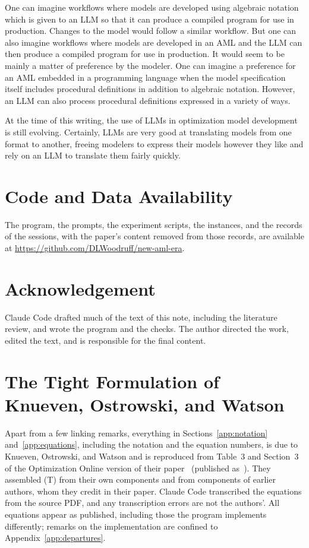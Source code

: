 \documentclass[11pt]{article}
\begin{document}
One can imagine workflows where models are developed using algebraic
notation which is given to an LLM so that it can produce a compiled
program for use in production. Changes to the model would follow a
similar workflow. But one can also imagine workflows where models are
developed in an AML and the LLM can then produce a compiled program
for use in production. It would seem to be mainly a matter of
preference by the modeler.  One can imagine a preference
for an AML embedded in a programming language when the model
specification itself includes procedural definitions in addition to
algebraic notation. However, an LLM can also process procedural definitions
expressed in a variety of ways.

At the time of this writing, the use of LLMs in optimization model
development is still evolving. Certainly, LLMs are very good at
translating models from one format to another, freeing modelers to
express their models however they like and rely on an LLM to translate
them fairly quickly.

\section*{Code and Data Availability}

The program, the prompts, the experiment scripts, the instances, and the records of the sessions, with the paper's content removed from those records, are available at \url{https://github.com/DLWoodruff/new-aml-era}.

\section*{Acknowledgement}

Claude Code drafted much of the text of this note, including the literature review, and wrote the program and the checks. The author directed the work, edited the text, and is responsible for the final content.

\appendix

\section{The Tight Formulation of Knueven, Ostrowski, and Watson}
\label{app:formulation}

Apart from a few linking remarks, everything in Sections~\ref{app:notation} and~\ref{app:equations}, including the notation and the equation numbers, is due to Knueven, Ostrowski, and Watson and is reproduced from Table~3 and Section~3 of the Optimization Online version of their paper~\cite{knueven2018ool} (published as~\cite{knueven2020}). They assembled (T) from their own components and from components of earlier authors, whom they credit in their paper. Claude Code transcribed the equations from the source PDF, and any transcription errors are not the authors'. All equations appear as published, including those the program implements differently; remarks on the implementation are confined to Appendix~\ref{app:departures}.
\end{document}
